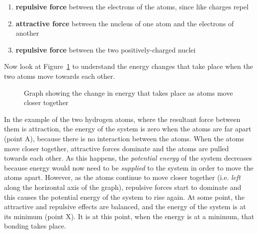 \begin{enumerate}[noitemsep]
\item{\textbf{repulsive force} between the electrons of the atoms, since like charges repel}
\item{\textbf{attractive force} between the nucleus of one atom and the electrons of another}
\item{\textbf{repulsive force} between the two positively-charged nuclei}
\end{enumerate}

Now look at Figure~\ref{fig:bonding:energy} to understand the energy changes that take place when the two atoms move towards each other. 

\begin{figure}[H]
\begin{center}
\caption{Graph showing the change in energy that takes place as atoms move closer together}
\label{fig:bonding:energy}
\end{center}
\end{figure}

In the example of the two hydrogen atoms, where the resultant force between them is attraction, the energy of the system is zero when the atoms are far apart (point A), because there is no interaction between the atoms. When the atoms move closer together, attractive forces dominate and the atoms are pulled towards each other. As this happens, the \textit{potential energy} of the system decreases because energy would now need to be \textit{supplied} to the system in order to move the atoms apart. However, as the atoms continue to move closer together (i.e.\@{} \textit{left} along the horizontal axis of the graph), repulsive forces start to dominate and this causes the potential energy of the system to rise again. At some point, the attractive and repulsive effects are balanced, and the energy of the system is at its minimum (point X). It is at this point, when the energy is at a minimum, that bonding takes place.\\


